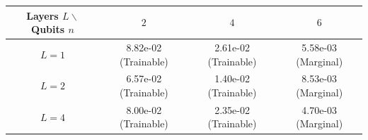 \begin{tabular}{cccc}
\toprule
Layers $L \backslash$ Qubits $n$ & $2$ & $4$ & $6$ \\
\midrule
$L=1$ & 8.82e-02 (Trainable) & 2.61e-02 (Trainable) & 5.58e-03 (Marginal) \\
$L=2$ & 6.57e-02 (Trainable) & 1.40e-02 (Trainable) & 8.53e-03 (Marginal) \\
$L=4$ & 8.00e-02 (Trainable) & 2.35e-02 (Trainable) & 4.70e-03 (Marginal) \\
\bottomrule
\end{tabular}